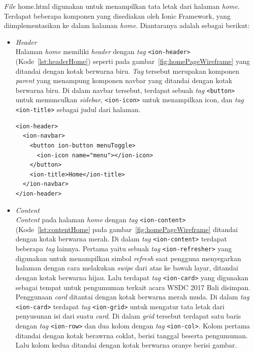 \begin{enumerate}
\textit{File} home.html digunakan untuk menampilkan tata letak dari halaman \textit{home}. Terdapat beberapa komponen yang disediakan oleh Ionic Framework, yang diimplementasikan ke dalam halaman \textit{home}. Diantaranya adalah sebagai berikut:	

	\begin{itemize}
		\item \textit{Header} \\
		Halaman \textit{home} memiliki \textit{header} dengan \textit{tag} \texttt{<ion-header>} (Kode~\ref{lst:headerHome}) seperti pada gambar~\ref{fig:homePageWireframe} yang ditandai dengan kotak berwarna biru. \textit{Tag} tersebut merupakan komponen \textit{parent} yang menampung komponen navbar yang ditandai dengan kotak berwarna biru. Di dalam navbar tersebut, terdapat sebuah \textit{tag} \texttt{<button>} untuk memunculkan \textit{sidebar}, \texttt{<ion-icon>} untuk menampilkan icon, dan \textit{tag} \texttt{<ion-title>} sebagai judul dari halaman.
		
\begin{lstlisting}[label={lst:headerHome}, caption=\textit{Header} pada home.html]
<ion-header>
  <ion-navbar>
    <button ion-button menuToggle>
      <ion-icon name="menu"></ion-icon>
    </button>
    <ion-title>Home</ion-title>
  </ion-navbar>
</ion-header>
\end{lstlisting}

		\item \textit{Content} \\
		\textit{Content} pada halaman \textit{home} dengan \textit{tag} \texttt{<ion-content>} (Kode~\ref{lst:contentHome} pada gambar~\ref{fig:homePageWireframe} ditandai dengan kotak berwarna merah. Di dalam \textit{tag} \texttt{<ion-content>} terdapat beberapa \textit{tag} lainnya. Pertama yaitu sebuah \textit{tag} \texttt{<ion-refresher>} yang digunakan untuk menampilkan simbol \textit{refresh} saat pengguna menyegarkan halaman dengan cara melakukan \textit{swipe} dari atas ke bawah layar, ditandai dengan kotak berwarna hijau. Lalu terdapat \textit{tag} \texttt{<ion-card>} yang digunakan sebagai tempat untuk pengumuman terkait acara WSDC 2017 Bali disimpan. Penggunaan \textit{card} ditantai dengan kotak berwarna merah muda. Di dalam \textit{tag} \texttt{<ion-card>} terdapat \textit{tag} \texttt{<ion-grid>} untuk mengatur tata letak dari penyusunan isi dari suatu \textit{card}. Di dalam \textit{grid} tersebut terdapat satu baris dengan \textit{tag} \texttt{<ion-row>} dan dua kolom dengan \textit{tag} \texttt{<ion-col>}. Kolom pertama ditandai dengan kotak berawrna coklat, berisi tanggal beserta pengumuman. Lalu kolom kedua ditandai dengan kotak berwarna oranye berisi gambar.
		

\end{itemize}
\end{enumerate}
